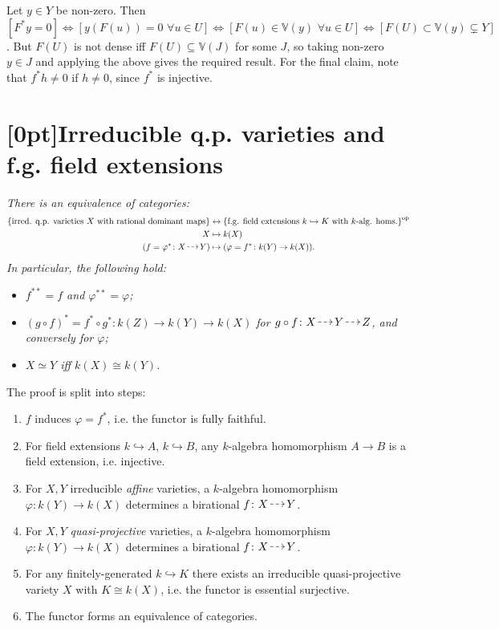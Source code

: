 \documentclass[10pt]{article}
\newcommand{\van}{\mathbb{V}}
\newcommand*{\DashedArrow}[1][]{\mathbin{\tikz [baseline=-0.25ex,-latex, densely dashed,#1] \draw [#1] (0pt,0.5ex) -- (1.3em,0.5ex);}}
\newcommand{\ratmap}{{\,\DashedArrow[->]\,}}
\newcommand{\op}[1]{{#1}^\text{op}}
\newcommand{\AG}{\textcolor{green}{AG}}
\begin{document}
\begin{itemize}
                    Let $y\in Y$ be non-zero.
                    Then $[F^*y=0]\iff [y(F(u))=0\,\,\forall u\in U]\iff[F(u)\in\van(y)\,\,\forall u\in U]\iff[F(U)\subset\van(y)\subsetneq Y]$.
                    But $F(U)$ is not dense iff $F(U)\subseteq\van(J)$ for some $J$, so taking non-zero $y\in J$ and applying the above gives the required result.
                    For the final claim, note that $f^*h\neq0$ if $h\neq0$, since $f^*$ is injective.
            \end{itemize}

    \section{\protect\marginnote{\AG}[0pt]Irreducible q.p. varieties and f.g. field extensions}

        \emph{There is an equivalence of categories:}
        \begin{align*}
            \{\text{irred. q.p. varieties $X$ with rational dominant maps}\} &\leftrightarrow \op{\{\text{f.g. field extensions $k\hookrightarrow K$ with $k$-alg. homs.}\}}\\
            X &\mapsto k(X)\\
            (f=\varphi^*\colon X\ratmap Y) &\mapsto (\varphi=f^*\colon k(Y)\to k(X)).
        \end{align*}
        \emph{In particular, the following hold:}
        \begin{itemize}
            \item \emph{$f^{**}=f$ and $\varphi^{**}=\varphi$;}
            \item \emph{$(g\circ f)^*=f^*\circ g^*\colon k(Z)\to k(Y)\to k(X)$ for $g\circ f\colon X\ratmap Y\ratmap Z$, and conversely for $\varphi$;}
            \item \emph{$X\simeq Y$ iff $k(X)\cong k(Y)$.}
        \end{itemize}

        The proof is split into steps:
        \begin{enumerate}
            \item $f$ induces $\varphi=f^*$, i.e. the functor is fully faithful.
            \item For field extensions $k\hookrightarrow A$, $k\hookrightarrow B$, any $k$-algebra homomorphism $A\to B$ is a field extension, i.e. injective.
            \item For $X,Y$ irreducible \emph{affine} varieties, a $k$-algebra homomorphism $\varphi\colon k(Y)\to k(X)$ determines a birational $f\colon X\ratmap Y$.
            \item For $X,Y$ \emph{quasi-projective} varieties, a $k$-algebra homomorphism $\varphi\colon k(Y)\to k(X)$ determines a birational $f\colon X\ratmap Y$.
            \item For any finitely-generated $k\hookrightarrow K$ there exists an irreducible quasi-projective variety $X$ with $K\cong k(X)$, i.e. the functor is essential surjective.
            \item The functor forms an equivalence of categories.
        \end{enumerate}
\end{document}
